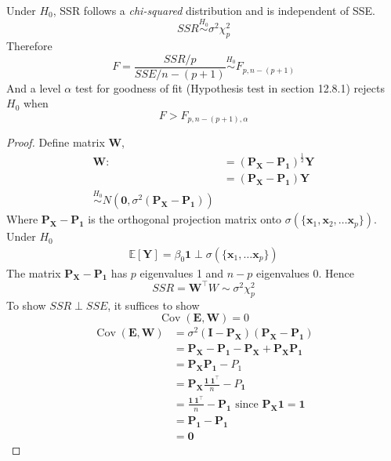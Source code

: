 \begin{result}
    Under $H_0$, SSR follows a \textit{chi-squared} distribution and is independent of SSE. \\
    \[
        SSR \overset{H_0}{\sim}  \sigma^2 \chi_p^2
    \]
    Therefore 
    \[
        F = \frac{SSR / p}{SSE /n - (p + 1)} \overset{H_0}{\sim}  F_{p, n-(p + 1)}
    \]
    And a level $\alpha$ test for goodness of fit (Hypothesis test in section 12.8.1) rejects $H_0$ when 
    \[
        F > F_{p, n- (p + 1), \alpha}
    \]
\end{result}

\begin{proof}
    Define matrix $\bm{W}$, 
    \begin{align*}
        \bm{W}:&= \left( \bm{P_X - P_1} \right)^{ \frac{1}{2}} \bm{Y} \\
        &= \left( \bm{P_X - P_1} \right)  \bm{Y} \\
        \overset{H_0}{\sim}  N \left( \bm{0}, \sigma^2 \left( \bm{P_X - P_1} \right)  \right) 
    \end{align*}
    Where $\bm{P_X - P_1}$ is the orthogonal projection matrix onto $\sigma \left( \{ \bm{x}_1, \bm{x}_2, \hdots \bm{x}_p \}  \right) $. \\

    Under $H_0$ 
    \begin{align*}
        \mathbb{E}\left[ \bm{Y}\right]  = \beta_0 \bm{1} \perp \sigma \left( \{ \bm{x}_1, \hdots \bm{x}_p \}  \right) 
    \end{align*}
    The matrix $\bm{P_X - P_1}$ has $p$ eigenvalues 1 and $n-p$ eigenvalues 0. Hence 
    \[
        SSR = \bm{W}^{\top} W \sim \sigma^2 \chi_p^2
    \]
    To show $SSR \perp SSE$, it suffices to show 
    \[
        \operatorname{Cov}  \left( \bm{E}, \bm{W} \right)  = 0 
    \]
    \begin{align*}
        \operatorname{Cov} \left( \bm{E}, \bm{W} \right)  &= \sigma^2 \left( \bm{I - P_X} \right)  \left( \bm{P_X - P_1} \right)  \\ 
        &= \bm{P_X} - \bm{P_1} - \bm{P_X} + \bm{P_X P_1} \\
        &= \bm{P_X P_1} - P_1 \\
        &= \bm{P_X} \frac{\bm{1}\ \bm{1}^{\top}}{n} - P_{\bm{1}} \\
        &= \frac{\bm{1}\ \bm{1}^{\top}}{n} - \bm{P_1} \text{ since } \bm{P_X 1 = 1} \\
        &= \bm{P_1} - \bm{P_1} \\
        &= \bm{0}
    \end{align*}
    
\end{proof}

